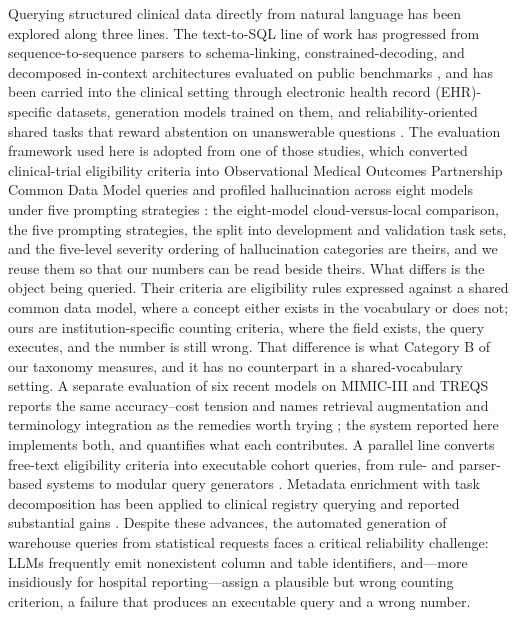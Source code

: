 \documentclass[10pt]{article}
\begin{document}
Querying structured clinical data directly from natural language has been explored along three lines. The text-to-SQL line of
work has progressed from sequence-to-sequence parsers to schema-linking,
constrained-decoding, and decomposed in-context architectures evaluated on public
benchmarks \cite{zhong2017,yu2018,wang2020,scholak2021,pourreza2023,bird2023,dailsql2024,macsql2024},
and has been carried into the clinical setting through electronic health record
(EHR)-specific datasets,
generation models trained on them, and reliability-oriented shared tasks that
reward abstention on unanswerable questions
\cite{treqs2020,medts2021,ehrsql2024,ragepi2024,rag2step2025}. The evaluation
framework used here is adopted from one of those studies, which converted
clinical-trial eligibility criteria into Observational Medical Outcomes Partnership
Common Data Model queries and profiled hallucination across eight models under
five prompting strategies \cite{lee2025}: the eight-model cloud-versus-local
comparison, the five prompting strategies, the split into development and
validation task sets, and the five-level severity ordering of hallucination
categories are theirs, and we reuse them so that our numbers can be read beside
theirs. What differs is the object being queried. Their criteria are eligibility
rules expressed against a shared common data model, where a concept either exists
in the vocabulary or does not; ours are institution-specific counting criteria,
where the field exists, the query executes, and the number is still wrong. That
difference is what Category B of our taxonomy measures, and it has no counterpart
in a shared-vocabulary setting. A separate evaluation of six recent models on
MIMIC-III and TREQS reports the same accuracy--cost tension and names
retrieval augmentation and terminology integration as the remedies worth trying
\cite{tankovic2025}; the system reported here implements both, and quantifies
what each contributes. A parallel line
converts free-text eligibility criteria into executable cohort queries, from
rule- and parser-based systems to modular query generators
\cite{c2q2019,trialpath2021,leafai2023}. Metadata enrichment with task
decomposition has been applied to clinical registry querying and reported
substantial gains \cite{metaclin2025}. Despite these advances, the automated generation of warehouse
queries from statistical requests faces a critical reliability challenge: LLMs
frequently emit nonexistent column and table identifiers, and---more insidiously
for hospital reporting---assign a plausible but wrong counting criterion, a
failure that produces an executable query and a wrong number.
\end{document}
